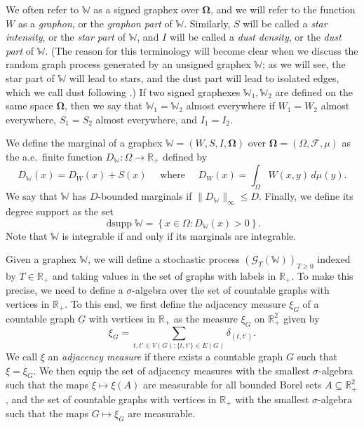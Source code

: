 \documentclass{amsart}
\numberwithin{equation}{section}
\numberwithin{figure}{section}
\theoremstyle{definition}
\theoremstyle{remark}
\DeclareMathOperator{\dsupp}{dsupp}
\newcommand{\bOmega}{{\mathbf{\Omega}}}
\newcommand{\RR}{\mathbb{R}}
\newcommand{\cW}{\mathbb{W}}
\newcommand{\cF}{\mathcal{F}}
\newcommand{\cG}{\mathcal{G}}
\begin{document}
We often refer to $\cW$ as a signed graphex over $\bOmega$, and we will refer
to the function $W$ as a \emph{graphon}, or the \emph{graphon part} of $\cW$.
Similarly, $S$ will be called a \emph{star intensity}, or the \emph{star
part} of $\cW$, and $I$ will be called a \emph{dust density}, or the
\emph{dust part} of $\cW$. (The reason for this terminology will become clear
when we discuss the random graph process generated by an unsigned graphex
$\cW$; as we will see, the star part of $\cW$ will lead to stars, and the
dust part will lead to isolated edges, which we call dust following
\cite{JANSON17}.) If two signed graphexes $\cW_1,\cW_2$ are defined on the
same space $\bOmega$, then we say that $\cW_1=\cW_2$ almost everywhere if
$W_1=W_2$ almost everywhere, $S_1=S_2$ almost everywhere, and $I_1=I_2$.

We define the marginal of a graphex $\cW=(W,S,I,\bOmega)$ over
$\bOmega=(\Omega,\cF,\mu)$ as the a.e.\ finite function $D_\cW\colon
\Omega\to\RR_+$ defined by
\[
D_\cW(x)=D_W(x)+S(x)\quad\text{ where }\quad D_W(x)=\int_{\Omega} W(x,y)\,d\mu(y).
\]
We say that $\cW$ has $D$-bounded marginals if $\|D_{\cW}\|_\infty \le D$.
Finally, we define its degree support as the set
\[
\dsupp \cW=\left\{x\in\Omega : D_{\cW}(x)>0\right\}.
\]
Note that $\cW$ is integrable if and only if its marginals are integrable.

Given a graphex $\cW$, we will define a stochastic process
$(\cG_T(\cW))_{T\geq 0}$ indexed by $T\in\RR_+$ and taking values in the set
of graphs with labels in $\RR_+$. To make this precise, we need to define a
$\sigma$-algebra over the set of countable graphs with vertices in $\RR_+$.
To this end, we first define the adjacency measure $\xi_G$ of a countable
graph $G$ with vertices in $\RR_+$ as the measure $\xi_G$ on $\RR_+^2$ given
by
\[
\xi_G=\sum_{t,t'\in V(G):\{t,t'\}\in E(G)}\delta_{(t,t')}.
\]
We call $\xi$ an \emph{adjacency measure} if there exists a countable graph
$G$ such that $\xi=\xi_G$. We then equip the set of adjacency measures with
the smallest $\sigma$-algebra such that the maps $\xi\mapsto \xi(A)$ are
measurable for all bounded Borel sets $A\subseteq\RR_+^2$, and the set of
countable graphs with vertices in $\RR_+$ with the smallest $\sigma$-algebra
such that the maps $G\mapsto \xi_G$ are measurable.
\end{document}
